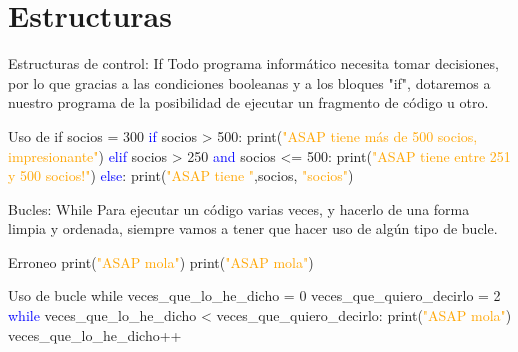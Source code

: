 \documentclass{beamer}
\begin{document}
\section{Estructuras}

\begin{frame}{Estructuras de control: If}
Todo programa informático necesita tomar decisiones, por lo que gracias a las condiciones booleanas y a los bloques "if", dotaremos a nuestro programa de la posibilidad de ejecutar un fragmento de código u otro.
\begin{Programexample} {Uso de if}
socios = 300 \newline
\textcolor{blue}{if} socios > 500:\newline
\hspace*{1cm} print(\textcolor{orange}{"ASAP tiene más de 500 socios, impresionante"})\newline
\textcolor{blue}{elif} socios > 250 \textcolor{blue}{and} socios <= 500:\newline
\hspace*{1cm} print(\textcolor{orange}{"ASAP tiene entre 251 y 500 socios!"})\newline
\textcolor{blue}{else}:\newline
\hspace*{1cm} print(\textcolor{orange}{"ASAP tiene "},socios, \textcolor{orange}{"socios"})
\end{Programexample}
\end{frame}

\begin{frame}{Bucles: While}
Para ejecutar un código varias veces, y hacerlo de una forma limpia y ordenada, siempre vamos a tener que hacer uso de algún tipo de bucle.
\begin{Programexample}{Erroneo}
print(\textcolor{orange}{"ASAP mola"}) \newline
print(\textcolor{orange}{"ASAP mola"})
\end{Programexample}
\begin{Programexample}{Uso de bucle while}
veces\_que\_lo\_he\_dicho = 0 \newline
veces\_que\_quiero\_decirlo = 2 \newline
\textcolor{blue}{while} veces\_que\_lo\_he\_dicho < veces\_que\_quiero\_decirlo: \newline
\hspace*{1cm} print(\textcolor{orange}{"ASAP mola"}) \newline
\hspace*{1cm} veces\_que\_lo\_he\_dicho++ %
\end{Programexample}
\end{frame}
\end{document}

